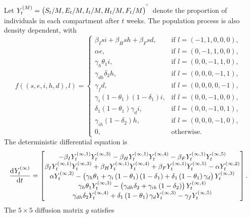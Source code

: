 Let \(Y_t^{(M)} = \left(S_t / M, E_t / M, I_t / M, H_t / M, F_t / M\right)^{^{\!\top}}\) denote the proportion of individuals in each compartment after \(t\) weeks.
The population process is also density dependent, with
\[
	f\!\left(\left(s, e, i, h, d\right), l\right) = \begin{cases}
		\beta_I s i + \beta_H sh + \beta_F sd,                        & \text{if } l = \left(-1, 1, 0, 0, 0\right), \\
		\alpha e,                                                     & \text{if } l = \left(0, -1, 1, 0, 0\right), \\
		\gamma_h \theta_1 i,                                          & \text{if } l = \left(0, 0, -1, 1, 0\right), \\
		\gamma_{dh}\delta_2 h,                                        & \text{if } l = \left(0, 0, 0, -1, 1\right), \\
		\gamma_f d,                                                   & \text{if } l = \left(0, 0, 0, 0, -1\right), \\
		\gamma_i\left(1 - \theta_1\right)\left(1 - \delta_1\right) i, & \text{if } l = \left(0,0,-1,0,0\right),     \\
		\delta_1\left(1 - \theta_1\right)\gamma_d i,                  & \text{if } l = \left(0,0,-1,0,1\right),     \\
		\gamma_{ih}\left(1 - \delta_2\right)h,                        & \text{if } l = \left(0,0,0,-1,0\right),     \\
		0,                                                            & \text{otherwise}.
	\end{cases}
\]
The deterministic differential equation is
\[
	\dod{Y_t^{(\infty)}}{t} = \begin{bmatrix}
		-\beta_I Y_t^{(\infty, 1)}Y_t^{(\infty, 3)} - \beta_H Y_t^{(\infty, 1)}Y_t^{(\infty, 4)} - \beta_F Y_t^{(\infty, 1)}Y_t^{(\infty,5)}                                                \\
		\beta_I Y_t^{(\infty, 1)}Y_t^{(\infty, 3)} + \beta_H Y_t^{(\infty, 1)}Y_t^{(\infty, 4)} + \beta_F Y_t^{(\infty, 1)}Y_t^{(\infty,5)} - \alpha Y_t^{(\infty, 2)}                      \\
		\alpha Y_t^{(\infty, 2)} - \left(\gamma_h\theta_1 + \gamma_i\left(1 - \theta_1\right)\left(1 - \delta_1\right) + \delta_1\left(1 - \theta_1\right)\gamma_d\right) Y_t^{(\infty, 3)} \\
		\gamma_h\theta_1 Y_t^{(\infty, 3)} - \left(\gamma_{dh}\delta_2 + \gamma_{ih}\left(1 - \delta_2\right) \right) Y_t^{(\infty, 4)}                                                     \\
		\gamma_{dh}\delta_2 Y_t^{(\infty, 4)} + \delta_1\left(1 - \theta_1\right)\gamma_d Y_t^{(\infty, 3)} - \gamma_f Y_t^{(\infty, 5)}
	\end{bmatrix}.
\]
The \(5\times 5\) diffusion matrix \(g\) satisfies

